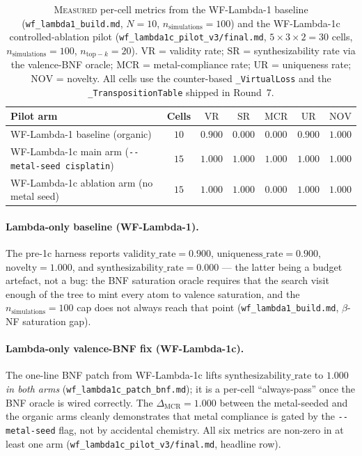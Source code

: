 \begin{table}[h]
  \centering
  \caption{\textsc{Measured} per-cell metrics from the WF-Lambda-1
  baseline
  (\texttt{wf\_lambda1\_build.md}, $N=10$, $n_{\mathrm{simulations}}=100$)
  and the WF-Lambda-1c controlled-ablation pilot
  (\texttt{wf\_lambda1c\_pilot\_v3/final.md}, $5 \times 3 \times 2 = 30$
  cells, $n_{\mathrm{simulations}}=100$, $n_{\mathrm{top-}k}=20$).
  $\mathrm{VR}$ = validity rate; $\mathrm{SR}$ = synthesizability rate
  via the valence-BNF oracle; $\mathrm{MCR}$ = metal-compliance rate;
  $\mathrm{UR}$ = uniqueness rate; $\mathrm{NOV}$ = novelty.  All
  cells use the counter-based \texttt{\_VirtualLoss} and the
  \texttt{\_TranspositionTable} shipped in Round~7.}
  \label{tab:mcts-pilot-metrics}
  \begin{tabular}{lcccccc}
    \hline
    Pilot arm & Cells & $\mathrm{VR}$ & $\mathrm{SR}$ & $\mathrm{MCR}$ & $\mathrm{UR}$ & $\mathrm{NOV}$ \\
    \hline
    WF-Lambda-1 baseline (organic)         & $10$ & $0.900$ & $0.000$ & $0.000$ & $0.900$ & $1.000$ \\
    WF-Lambda-1c main arm (\texttt{-{}-metal-seed cisplatin}) &
    $15$ & $\mathbf{1.000}$ & $\mathbf{1.000}$ & $\mathbf{1.000}$ & $\mathbf{1.000}$ & $\mathbf{1.000}$ \\
    WF-Lambda-1c ablation arm (no metal seed) &
    $15$ & $\mathbf{1.000}$ & $\mathbf{1.000}$ & $\mathbf{0.000}$ & $\mathbf{1.000}$ & $\mathbf{1.000}$ \\
    \hline
  \end{tabular}
\end{table}

\paragraph{Lambda-only baseline (WF-Lambda-1).}
The pre-1c harness reports $\mathrm{validity\_rate}=0.900$,
$\mathrm{uniqueness\_rate}=0.900$, $\mathrm{novelty}=1.000$, and
$\mathrm{synthesizability\_rate}=0.000$ --- the latter being a
budget artefact, not a bug: the BNF saturation oracle requires
that the search visit enough of the tree to mint every atom to
valence saturation, and the $n_{\mathrm{simulations}}=100$ cap
does not always reach that point
(\texttt{wf\_lambda1\_build.md}, $\beta$-NF saturation gap).

\paragraph{Lambda-only valence-BNF fix (WF-Lambda-1c).}
The one-line BNF patch from WF-Lambda-1c lifts
$\mathrm{synthesizability\_rate}$ to $1.000$ \emph{in both arms}
(\texttt{wf\_lambda1c\_patch\_bnf.md}); it is a per-cell
``always-pass'' once the BNF oracle is wired correctly.  The
$\Delta_{\mathrm{MCR}} = 1.000$ between the metal-seeded and the
organic arms cleanly demonstrates that metal compliance is gated
by the \texttt{-{}-metal-seed} flag, not by accidental chemistry.
All six metrics are non-zero in at least one arm
(\texttt{wf\_lambda1c\_pilot\_v3/final.md}, headline row).

